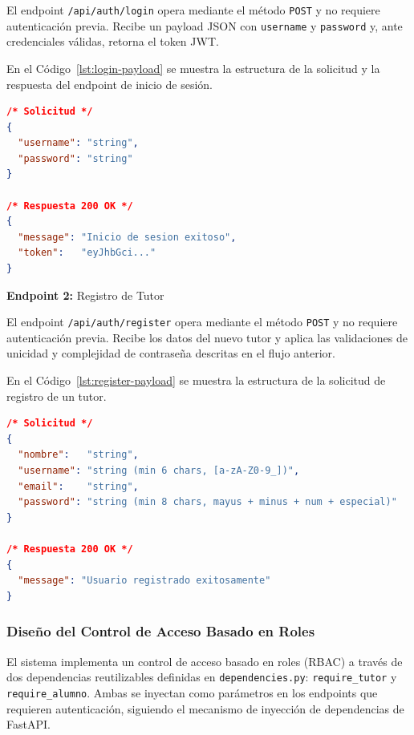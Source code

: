 El endpoint \texttt{/api/auth/login} opera mediante el método
\texttt{POST} y no requiere autenticación previa. Recibe un payload
JSON con \texttt{username} y \texttt{password} y, ante credenciales
válidas, retorna el token JWT.
 
En el Código~\ref{lst:login-payload} se muestra la estructura de la solicitud y la respuesta del endpoint de inicio de sesión.

\begin{lstlisting}[language=json, caption={Payload de solicitud y respuesta del endpoint de login}, label={lst:login-payload}]
/* Solicitud */
{
  "username": "string",
  "password": "string"
}
 
/* Respuesta 200 OK */
{
  "message": "Inicio de sesion exitoso",
  "token":   "eyJhbGci..."
}
\end{lstlisting}
 
\textbf{Endpoint 2:} Registro de Tutor
 
El endpoint \texttt{/api/auth/register} opera mediante el método
\texttt{POST} y no requiere autenticación previa. Recibe los datos del
nuevo tutor y aplica las validaciones de unicidad y complejidad de
contraseña descritas en el flujo anterior.
 
En el Código~\ref{lst:register-payload} se muestra la estructura de la solicitud de registro de un tutor.

\begin{lstlisting}[language=json, caption={Payload de solicitud del endpoint de registro}, label={lst:register-payload}]
/* Solicitud */
{
  "nombre":   "string",
  "username": "string (min 6 chars, [a-zA-Z0-9_])",
  "email":    "string",
  "password": "string (min 8 chars, mayus + minus + num + especial)"
}
 
/* Respuesta 200 OK */
{
  "message": "Usuario registrado exitosamente"
}
\end{lstlisting}
 
\subsubsection{Diseño del Control de Acceso Basado en Roles}
 
El sistema implementa un control de acceso basado en roles (RBAC) a
través de dos dependencias reutilizables definidas en
\texttt{dependencies.py}: \texttt{require\_tutor} y
\texttt{require\_alumno}. Ambas se inyectan como parámetros en los
endpoints que requieren autenticación, siguiendo el mecanismo de
inyección de dependencias de FastAPI.
 
